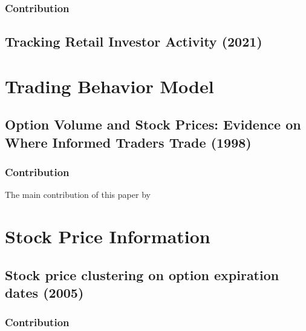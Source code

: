 \documentclass[10pt]{report}
\begin{document}
\subsubsection{Contribution}


















\subsection{Tracking Retail Investor Activity (2021)}




\section{Trading Behavior Model}
\subsection{Option Volume and Stock Prices: Evidence on Where Informed Traders Trade (1998)}
\subsubsection{Contribution}
The main contribution of this paper by \citet{Easley1998OptionVA}











\clearpage
\section{Stock Price Information}




\subsection{Stock price clustering on option
expiration dates (2005)}

\subsubsection{Contribution}
\end{document}
